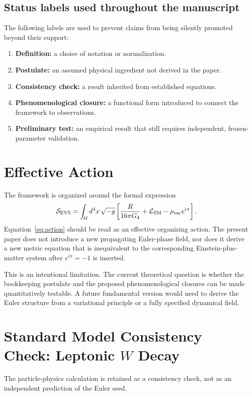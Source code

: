 \documentclass[twocolumn]{aastex631}
\begin{document}
\subsection{Status labels used throughout the manuscript}
The following labels are used to prevent claims from being silently promoted beyond their support:
\begin{enumerate}[leftmargin=2.1em]
    \item \textbf{Definition:} a choice of notation or normalization.
    \item \textbf{Postulate:} an assumed physical ingredient not derived in the paper.
    \item \textbf{Consistency check:} a result inherited from established equations.
    \item \textbf{Phenomenological closure:} a functional form introduced to connect the framework to observations.
    \item \textbf{Preliminary test:} an empirical result that still requires independent, frozen-parameter validation.
\end{enumerate}

\section{Effective Action}
The framework is organized around the formal expression
\begin{equation}
\mathcal S_{\rm EVS}
=\int_{\mathcal U}d^4x\,\sqrt{-g}
\left[
\frac{R}{16\pi G_4}
+\mathcal L_{\rm SM}
-\rho_{\rm vac}e^{i\pi}
\right].
\label{eq:action}
\end{equation}
Equation~\eqref{eq:action} should be read as an effective organizing action. The present paper does not introduce a new propagating Euler-phase field, nor does it derive a new metric equation that is inequivalent to the corresponding Einstein-plus-matter system after $e^{i\pi}=-1$ is inserted.

This is an intentional limitation. The current theoretical question is whether the bookkeeping postulate and the proposed phenomenological closures can be made quantitatively testable. A future fundamental version would need to derive the Euler structure from a variational principle or a fully specified dynamical field.

\section{Standard Model Consistency Check: Leptonic $W$ Decay}
The particle-physics calculation is retained as a consistency check, not as an independent prediction of the Euler seed.
\end{document}
